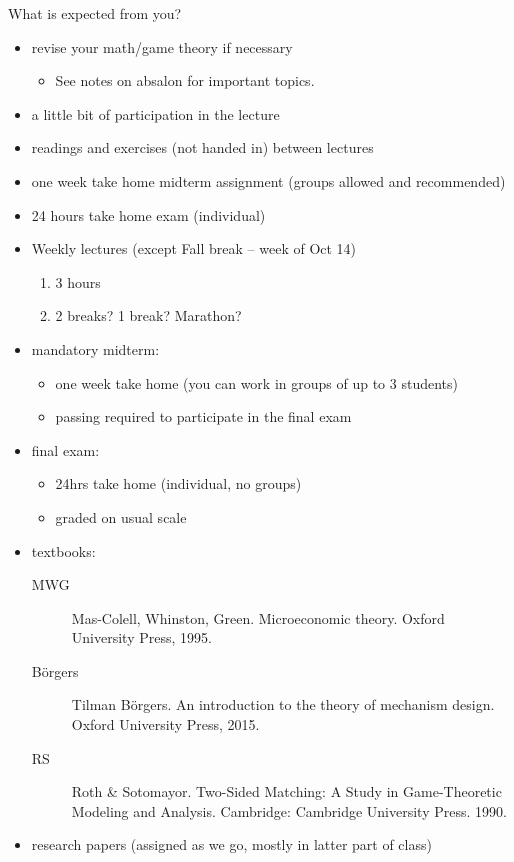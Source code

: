 \documentclass[english,handout,10pt]{beamer}		%
\def\lyxframeend{} %
\begin{document}
What is expected from you?
\begin{itemize}
	\item revise your math/game theory if necessary
	\begin{itemize}
		\item See notes on absalon for important topics.
	\end{itemize}
	\item a little bit of participation in the lecture
	\item readings and exercises (not handed in) between lectures
	\item one week take home midterm assignment (groups allowed and recommended)
	\item 24 hours take home exam (individual)
\end{itemize}
\lyxframeend


\begin{itemize}
	\item Weekly lectures (except Fall break -- week of Oct 14)
	\begin{enumerate}
		\item 3 hours
		\item 2 breaks? 1 break? Marathon?
	\end{enumerate}

	\pause
	\item mandatory midterm:
	\begin{itemize}
		\item one week take home (you can work in groups of up to 3 students)
		\item passing required to participate in the final exam
	\end{itemize}
	
	\item final exam:
	\begin{itemize}
		\item 24hrs take home (individual, no groups)
		\item graded on usual scale
	\end{itemize}
\end{itemize}
\lyxframeend


\begin{itemize}
	\item textbooks:
	\begin{description}
		\item[MWG] Mas-Colell,  Whinston, Green. Microeconomic theory. Oxford University Press, 1995. 
		\item[B\"{o}rgers] Tilman B\"{o}rgers. An introduction to the theory of mechanism design. Oxford University Press, 2015.
		\item[RS] Roth \& Sotomayor. Two-Sided Matching: A Study in Game-Theoretic Modeling and Analysis. Cambridge: Cambridge University Press. 1990. 
	\end{description}
	\item research papers (assigned as we go, mostly in latter part of class)
\end{itemize}
\lyxframeend
\end{document}
